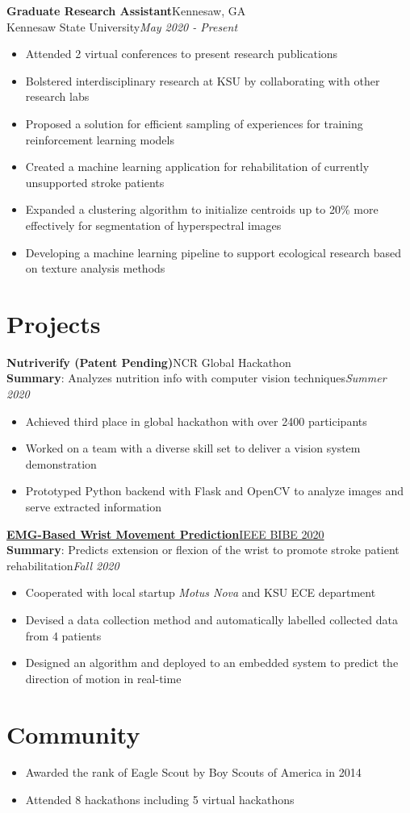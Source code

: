 \documentclass[letterpaper,11pt]{article}
\newcommand{\resumeItem}[1]{
  \item\small{
    #1 \vspace{-5pt}
  }
}
\newcommand{\resumeSubheading}[4]{
    \textbf{#1}\hfill #2 \\
    {\small#3}\hfill\textit{\small #4} \\
    \vspace{-5pt}
}
\newcommand{\resumeItemListStart}{\begin{itemize}}
\newcommand{\resumeItemListEnd}{\end{itemize}\vspace{-3pt}}
\begin{document}
\resumeSubheading
{Graduate Research Assistant}{Kennesaw, GA}
{Kennesaw State University}{May 2020 - Present}
\resumeItemListStart
\resumeItem
{Attended 2 virtual conferences to present research publications}
\resumeItem
{Bolstered interdisciplinary research at KSU by collaborating with other research labs}
\resumeItem
{Proposed a solution for efficient sampling of experiences for training
  reinforcement learning models}
\resumeItem
{Created a machine learning application for rehabilitation of currently unsupported stroke patients}
\resumeItem
{Expanded a clustering algorithm to initialize centroids up to 20\% more effectively for
  segmentation of hyperspectral images}
\resumeItem
{Developing a machine learning pipeline to support ecological research based on
  texture analysis methods}
\resumeItemListEnd

\section{Projects}

\resumeSubheading
{Nutriverify (Patent Pending)}{NCR Global Hackathon}
{\textbf{Summary}: Analyzes nutrition info with computer vision techniques}{Summer 2020}
\resumeItemListStart
\resumeItem
{Achieved third place in global hackathon with over 2400 participants}
\resumeItem
{Worked on a team with a diverse skill set to deliver a vision system demonstration}
\resumeItem
{Prototyped Python backend with Flask and OpenCV to analyze images and serve
  extracted information}
\resumeItemListEnd

\resumeSubheading
{\href{https://doi.org/10.1109/BIBE50027.2020.00172}{EMG-Based Wrist Movement
    Prediction}}
{\href{https://ieeexplore.ieee.org/servlet/opac?punumber=9287816}{IEEE BIBE 2020}}
{\textbf{Summary}: Predicts extension or flexion of the wrist to promote stroke patient rehabilitation}{Fall 2020}
\resumeItemListStart
\resumeItem
{Cooperated with local startup \textit{Motus Nova} and KSU ECE department}
\resumeItem
{Devised a data collection method and automatically labelled collected data from
  4 patients}
\resumeItem
{Designed an algorithm and deployed to an embedded system to predict the direction of motion in real-time}
\resumeItemListEnd

\section{Community}
\resumeItemListStart
\resumeItem
{Awarded the rank of Eagle Scout by Boy Scouts of America in 2014}
\resumeItem
{Attended 8 hackathons including 5 virtual hackathons}
\resumeItemListEnd


\end{document}
